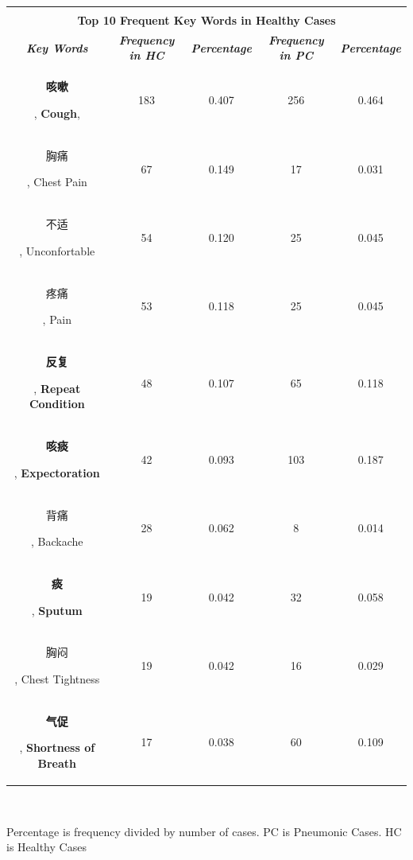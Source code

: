 \documentclass[journal]{IEEEtran}
\begin{document}
\begin{table}[htb]
\begin{center}
\begin{tabular}{c|c|c|c|c}
\hline
\multicolumn{5}{c}{}\\
\multicolumn{5}{c}{\textbf{Top 10 Frequent Key Words in Healthy Cases}} \\
        \hline
        \textbf{\textit{Key Words}} & \textbf{\textit{Frequency in HC}} & \textbf{\textit{Percentage}}& \textbf{\textit{Frequency in PC}}& \textbf{\textit{Percentage}} \\
    \hline
    \begin{CJK}{UTF8}{gbsn}\textbf{咳嗽}\end{CJK}, \textbf{Cough},  & 183 & 0.407 & 256 & 0.464\\
    \begin{CJK}{UTF8}{gbsn}胸痛\end{CJK}, Chest Pain & 67 & 0.149 & 17 & 0.031\\
    \begin{CJK}{UTF8}{gbsn}不适\end{CJK}, Unconfortable & 54 & 0.120 & 25 & 0.045\\
    \begin{CJK}{UTF8}{gbsn}疼痛\end{CJK}, Pain & 53 & 0.118 & 25 & 0.045\\
    \begin{CJK}{UTF8}{gbsn}\textbf{反复}\end{CJK}, \textbf{Repeat Condition} & 48 & 0.107 & 65 & 0.118\\
    \begin{CJK}{UTF8}{gbsn}\textbf{咳痰}\end{CJK}, \textbf{Expectoration} & 42 & 0.093 & 103 & 0.187\\
    \begin{CJK}{UTF8}{gbsn}背痛\end{CJK}, Backache & 28 & 0.062 & 8 & 0.014\\
    \begin{CJK}{UTF8}{gbsn}\textbf{痰}\end{CJK}, \textbf{Sputum}& 19 & 0.042 & 32 & 0.058\\
    \begin{CJK}{UTF8}{gbsn}胸闷\end{CJK}, Chest Tightness & 19 & 0.042 & 16 & 0.029\\
    \begin{CJK}{UTF8}{gbsn}\textbf{气促}\end{CJK}, \textbf{Shortness of Breath}& 17 & 0.038 & 60 & 0.109\\
    
    \hline

\end{tabular}
\vspace{0cm}
\\

\end{center}
\footnotesize{Percentage is frequency divided by number of cases. PC is Pneumonic Cases. HC is Healthy Cases}
\label{frequency1}

\vspace{-0cm}
\end{table}
    
\end{document}
